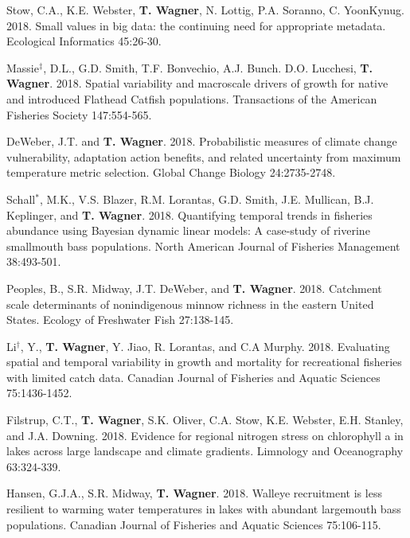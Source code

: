 \documentclass[10pt]{article}
\begin{document}
\begin{flushleft}
\begin{etaremune}[start=81]
\item Stow, C.A., K.E. Webster, {\bf T. Wagner}, N. Lottig, P.A. Soranno, C. YoonKynug. 2018. Small values in big data: the continuing need for appropriate metadata. Ecological Informatics 45:26-30. 

\item Massie$^\ddagger$, D.L., G.D. Smith, T.F. Bonvechio, A.J. Bunch. D.O. Lucchesi, {\bf T. Wagner}. 2018. Spatial variability and macroscale drivers of growth for native and introduced Flathead Catfish populations. Transactions of the American Fisheries Society 147:554-565.

\item DeWeber, J.T. and {\bf T. Wagner}. 2018. Probabilistic measures of climate change vulnerability, adaptation action benefits, and related uncertainty from maximum temperature metric selection. Global Change Biology 24:2735-2748.

\item Schall$^*$, M.K., V.S. Blazer, R.M. Lorantas, G.D. Smith, J.E. Mullican, B.J. Keplinger, and {\bf T. Wagner}. 2018. Quantifying temporal trends in fisheries abundance using Bayesian dynamic linear models: A case-study of riverine smallmouth bass populations. North American Journal of Fisheries Management 38:493-501.

\item Peoples, B., S.R. Midway, J.T. DeWeber, and {\bf T. Wagner}. 2018. Catchment scale determinants of nonindigenous minnow richness in the eastern United States. Ecology of Freshwater Fish 27:138-145.

\item Li$^\dagger$, Y., {\bf T. Wagner}, Y. Jiao, R. Lorantas, and C.A Murphy. 2018. Evaluating spatial and temporal variability in growth and mortality for recreational fisheries with limited catch data. Canadian Journal of Fisheries and Aquatic Sciences 75:1436-1452.

\item Filstrup, C.T., {\bf T. Wagner}, S.K. Oliver, C.A. Stow, K.E. Webster, E.H. Stanley, and J.A. Downing. 2018. Evidence for regional nitrogen stress on chlorophyll a in lakes across large landscape and climate gradients. Limnology and Oceanography 63:324-339.

\item Hansen, G.J.A., S.R. Midway, {\bf T. Wagner}. 2018. Walleye recruitment is less resilient to warming water temperatures in lakes with abundant largemouth bass populations. Canadian Journal of Fisheries and Aquatic Sciences 75:106-115.


\end{etaremune}
\end{flushleft}
\end{document}
